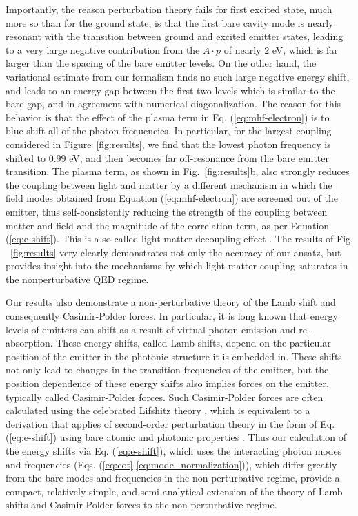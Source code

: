 \documentclass[aps,prl,twocolumn,
	groupedaddress,superscriptaddress,
	amsfonts,amssymb,amsmath,floatfix,
	citeautoscript]{revtex4-1}
\begin{document}
Importantly, the reason perturbation theory fails for first excited state, much more so than for the ground state, is that the first bare cavity mode is nearly resonant with the transition between ground and excited emitter states, leading to a very large negative contribution from the $A\cdot p$ of nearly $2$ eV, which is far larger than the spacing of the bare emitter levels. On the other hand, the variational estimate from our formalism finds no such large negative energy shift, and leads to an energy gap between the first two levels which is similar to the bare gap, and in agreement with numerical diagonalization. The reason for this behavior is that the effect of the plasma term in Eq. (\ref{eq:mhf-electron}) is to blue-shift all of the photon frequencies. In particular, for the largest coupling considered in Figure~\ref{fig:results}, we find that the lowest photon frequency is shifted to 0.99 eV, and then becomes far off-resonance from the bare emitter transition. The plasma term, as shown in Fig.~\ref{fig:results}b, also strongly reduces the coupling between light and matter by a different mechanism in which the field modes obtained from Equation (\ref{eq:mhf-electron}) are screened out of the emitter, thus self-consistently reducing the strength of the coupling between matter and field and the magnitude of the correlation term, as per Equation (\ref{eq:e-shift}). This is a so-called light-matter decoupling effect \cite{de2014light}. The results of Fig. ~\ref{fig:results} very clearly demonstrates not only the accuracy of our ansatz, but provides insight into the mechanisms by which light-matter coupling saturates in the nonperturbative QED regime. 

Our results also demonstrate a non-perturbative theory of the Lamb shift and consequently Casimir-Polder forces. In particular, it is long known that energy levels of emitters can shift as a result of virtual photon emission and re-absorption. These energy shifts, called Lamb shifts, depend on the particular position of the emitter in the photonic structure it is embedded in. These shifts not only lead to changes in the transition frequencies of the emitter, but the position dependence of these energy shifts also implies forces on the emitter, typically called Casimir-Polder forces. Such Casimir-Polder forces are often calculated using the celebrated Lifshitz theory \cite{lifshitz1956theory}, which is equivalent to a derivation that applies of second-order perturbation theory in the form of Eq. (\ref{eq:e-shift}) using bare atomic and photonic properties \cite{scheel2009macroscopic}. Thus our calculation of the energy shifts via Eq. (\ref{eq:e-shift}), which uses the interacting photon modes and frequencies (Eqs. (\ref{eq:cot}-\ref{eq:mode_normalization})), which differ greatly from the bare modes and frequencies in the non-perturbative regime, provide a compact, relatively simple, and semi-analytical extension of the theory of Lamb shifts and Casimir-Polder forces to the non-perturbative regime.
\end{document}

